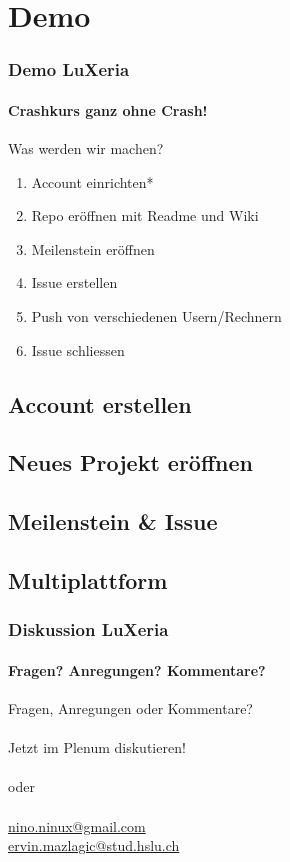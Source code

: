 \section{Demo}

\begin{frame}
    \frametitle{Demo \hfill{} LuXeria}
    \framesubtitle{Crashkurs ganz ohne Crash!}
    \begin{block}{Was werden wir machen?}
        \begin{enumerate}
            \item Account einrichten*
            \item Repo eröffnen mit Readme und Wiki
            \item Meilenstein eröffnen
            \item Issue erstellen
            \item Push von verschiedenen Usern/Rechnern
            \item Issue schliessen
    \end{enumerate}
    \end{block}
\end{frame}

\subsection{Account erstellen}
\begin{frame}
\end{frame}

\subsection{Neues Projekt eröffnen}
\begin{frame}
\end{frame}

\subsection{Meilenstein \& Issue}
\begin{frame}
\end{frame}

\subsection{Multiplattform}
\begin{frame}
\end{frame}

\begin{frame}\thispagestyle{empty}
	\frametitle{Diskussion \hfill{} \footnotesize{LuXeria}}
	\framesubtitle{Fragen? Anregungen? Kommentare?}
	\begin{center}
	\Large
	Fragen, Anregungen oder Kommentare?\\~\\
	Jetzt im Plenum diskutieren!\\~\\
	oder\\~\\
	\url{nino.ninux@gmail.com}\\
	\url{ervin.mazlagic@stud.hslu.ch}
	\end{center}
\end{frame}
